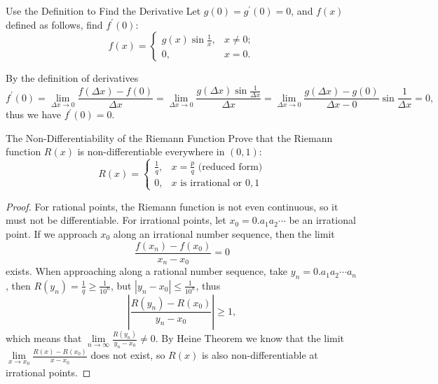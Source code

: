 \begin{example}{Use the Definition to Find the Derivative}{}
  Let $g(0) = g^{\prime}(0) = 0$, and $f(x)$ defined as follows, find $f^{\prime}(0)$:
  \begin{equation}
    f(x)=\begin{cases}
      g(x)\sin\frac{1}{x},&x\neq 0;\\
      0,&x=0.
    \end{cases}
  \end{equation}
\end{example}

\begin{solution}
  By the definition of derivatives
  \begin{equation}
    f^{\prime}(0)=\lim_{\Delta x\to0}\frac{f(\Delta x)-f(0)}{\Delta x}=\lim_{\Delta x\to0}\frac{g(\Delta x)\sin\frac{1}{\Delta x}}{\Delta x}=\lim_{\Delta x\to0}\frac{g(\Delta x)-g(0)}{\Delta x-0}\sin\frac{1}{\Delta x}=0,
  \end{equation}
  thus we have $f^{\prime}(0) = 0$.
\end{solution}

\begin{example}{The Non-Differentiability of the Riemann Function}{}
  Prove that the Riemann function $R(x)$ is non-differentiable everywhere in
  $(0, 1)$:
  \begin{equation}
    R(x)=\begin{cases}\frac{1}{q},&x=\frac{p}{q}\text{ (reduced form)}\\0,&x\text{ is irrational or }0,1\end{cases}
\end{equation}
\end{example}

\begin{proof}
  For rational points,
  the Riemann function is not even continuous,
  so it must not be differentiable.
  For irrational points,
  let $x_0 = 0.a_1a_2 \cdots$ be an irrational point.
  If we approach $x_0$ along an irrational number sequence,
  then the limit
  \begin{equation}
    \frac{f(x_n) - f(x_0)}{x_n - x_0} = 0
  \end{equation}
  exists. When approaching along a rational number sequence,
  take $y_n = 0.a_1a_2 \cdots a_n$,
  then $R(y_n) = \frac{1}{q} \geq \frac{1}{10^n}$,
  but $|y_n - x_0| \leq \frac{1}{10^n}$,
  thus
  \begin{equation}
    \left| \frac{R(y_n) - R(x_0)}{y_n - x_0} \right| \geq 1,
  \end{equation}
  which means that $\lim \limits _{n \rightarrow \infty} \frac{R(y_n)}{y_n -
    x_0} \neq 0$.
  By Heine Theorem we know that the limit $\lim \limits _{x \rightarrow x_0}
  \frac{R(x) - R(x_0)}{x - x_0}$ does not exist,
  so $R(x)$ is also non-differentiable at irrational points.
\end{proof}

